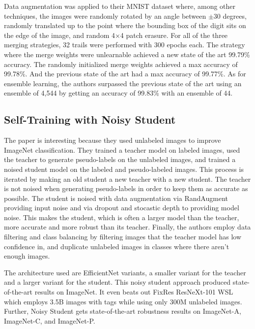 \documentclass{IEEEtran}
\begin{document}
Data augmentation was applied to their MNIST dataset where, among other
techniques, the images were randomly rotated by an angle between \(\pm 30\)
degrees, randomly translated up to the point where the bounding box of the digit
sits on the edge of the image, and random 4×4 patch erasure. For all of the
three merging strategies, 32 trails were performed with 300 epochs each. The
strategy where the merge weights were unlearnable achieved a new state of the
art 99.79\% accuracy. The randomly initialized merge weights achieved a max
accuracy of 99.78\%. And the previous state of the art had a max accuracy of
99.77\%. As for ensemble learning, the authors surpassed the previous state of
the art using an ensemble of 4,544 by getting an accuracy of 99.83\% with an
ensemble of 44.

\subsection{Self-Training with Noisy Student}
The paper \cite{xie2019selftraining} is interesting because they used unlabeled
images to improve ImageNet classification. They trained a teacher model on
labeled images, used the teacher to generate pseudo-labels on the unlabeled
images, and trained a noised student model on the labeled and pseudo-labeled
images. This process is iterated by making an old student a new teacher with a
new student. The teacher is not noised when generating pseudo-labels in order to
keep them as accurate as possible. The student is noised with data augmentation
via RandAugment \cite{cubuk2019randaugment} providing input noise and via
dropout and stocastic depth to providing model noise. This makes the student,
which is often a larger model than the teacher, more accurate and more robust
than its teacher. Finally, the authors employ data filtering and class balancing
by filtering images that the teacher model has low confidence in, and duplicate
unlabeled images in classes where there aren't enough images.

The architecture used are EfficientNet \cite{tan2019efficientnet} variants, a
smaller variant for the teacher and a larger variant for the student. This noisy
student approach produced state-of-the-art results on ImageNet. It even beats
out FixRes ResNeXt-101 WSL which employs 3.5B images with tags while using only
300M unlabeled images. Further, Noisy Student gets state-of-the-art robustness
results on ImageNet-A, ImageNet-C, and ImageNet-P.
\end{document}

